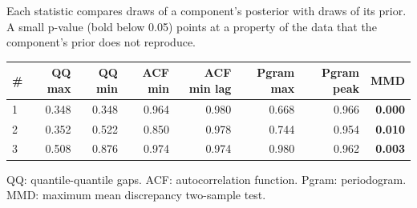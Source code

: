 \documentclass[11pt,a4paper]{article}
\begin{document}
Each statistic compares draws of a component's posterior with draws of its prior. A small p-value (bold below 0.05) points at a property of the data that the component's prior does not reproduce.

\begin{center}
\begin{tabular}{lrrrrrrr}
\toprule
\# & QQ max & QQ min & ACF min & ACF min lag & Pgram max & Pgram peak & MMD \\
\midrule
1 & 0.348 & 0.348 & 0.964 & 0.980 & 0.668 & 0.966 & \textbf{0.000} \\
2 & 0.352 & 0.522 & 0.850 & 0.978 & 0.744 & 0.954 & \textbf{0.010} \\
3 & 0.508 & 0.876 & 0.974 & 0.974 & 0.980 & 0.962 & \textbf{0.003} \\
\bottomrule
\end{tabular}
\end{center}

QQ: quantile-quantile gaps. ACF: autocorrelation function. Pgram: periodogram. MMD: maximum mean discrepancy two-sample test.
\end{document}
